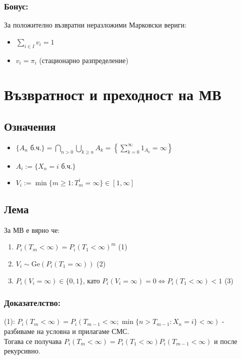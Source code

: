 \documentclass{article}
\begin{document}
\subsubsection*{Бонус:}
За положително възвратни неразложими Марковски вериги:
\begin{itemize}
\item $\sum_{i\in I} v_i = 1$
\item $v_i = \pi_i$ (стационарно разпределение)
\end{itemize}

\section{Възвратност и преходност на МВ}

\subsection{Означения}
\begin{itemize}
\item $\{A_n \text{ б.ч.}\} = \bigcap_{n>0} \bigcup_{k\geq n} A_k = \left\{\sum_{k=0}^\infty 1_{A_k} = \infty\right\}$
\item $A_i := \{X_n = i \text{ б.ч.}\}$
\item $V_i := \min\{m \geq 1 : T_m^i = \infty\} \in [1,\infty]$
\end{itemize}

\subsection{Лема}
За МВ е вярно че:
\begin{enumerate}
\item $P_i(T_m < \infty) = P_i(T_1 < \infty)^m$ \quad (1)
\item $V_i \sim \mathrm{Ge}(P_i(T_1 = \infty))$ \quad (2)
\item $P_i(V_i = \infty) \in \{0,1\}$, като $P_i(V_i = \infty) = 0 \Leftrightarrow P_i(T_1 < \infty) < 1$ \quad (3)
\end{enumerate}

\subsubsection*{Доказателство:}
(1): $P_i(T_m < \infty) = P_i(T_{m-1} < \infty; \min\{n > T_{m-1} : X_n = i\} < \infty)$ - разбиваме на условна и прилагаме СМС. \\
Тогава се получава $P_i(T_m < \infty) = P_i(T_1 < \infty)P_i(T_{m-1} < \infty)$ и после рекурсивно. \\
\end{document}
